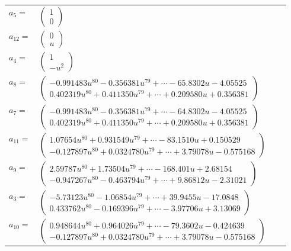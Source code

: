 \documentclass[1p]{elsarticle_modified}
\theoremstyle{definition}
\begin{document}
\begin{tabular}{m{7pt} m{180pt} m{7pt} m{180pt} }
\flushright $a_{5}=$&$\begin{pmatrix}1\\0\end{pmatrix}$ \\
\flushright $a_{12}=$&$\begin{pmatrix}0\\u\end{pmatrix}$ \\
\flushright $a_{4}=$&$\begin{pmatrix}1\\- u^2\end{pmatrix}$ \\
\flushright $a_{8}=$&$\begin{pmatrix}-0.991483 u^{80}-0.356381 u^{79}+\cdots-65.8302 u-4.05525\\0.402319 u^{80}+0.411350 u^{79}+\cdots+0.209580 u+0.356381\end{pmatrix}$ \\
\flushright $a_{7}=$&$\begin{pmatrix}-0.991483 u^{80}-0.356381 u^{79}+\cdots-64.8302 u-4.05525\\0.402319 u^{80}+0.411350 u^{79}+\cdots+0.209580 u+0.356381\end{pmatrix}$ \\
\flushright $a_{11}=$&$\begin{pmatrix}1.07654 u^{80}+0.931549 u^{79}+\cdots-83.1510 u+0.150529\\-0.127897 u^{80}+0.0324780 u^{79}+\cdots+3.79078 u-0.575168\end{pmatrix}$ \\
\flushright $a_{9}=$&$\begin{pmatrix}2.59787 u^{80}+1.73504 u^{79}+\cdots-168.401 u+2.68154\\-0.947267 u^{80}-0.463794 u^{79}+\cdots+9.86812 u-2.31021\end{pmatrix}$ \\
\flushright $a_{3}=$&$\begin{pmatrix}-5.73123 u^{80}-1.06854 u^{79}+\cdots+39.9455 u-17.0848\\0.433762 u^{80}-0.169396 u^{79}+\cdots-3.97706 u+3.13069\end{pmatrix}$ \\
\flushright $a_{10}=$&$\begin{pmatrix}0.948644 u^{80}+0.964026 u^{79}+\cdots-79.3602 u-0.424639\\-0.127897 u^{80}+0.0324780 u^{79}+\cdots+3.79078 u-0.575168\end{pmatrix}$ \\

\end{tabular}
\end{document}
